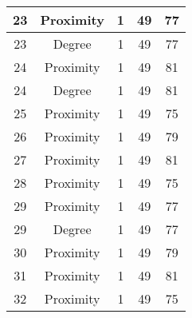 \documentclass[results.tex]{subfiles}
\begin{document}
\begin{center}
\begin{tabular}{| c || c | c | c | c |}
            \hline
            23                      & Proximity                    & 1                      & 49                      & 77                   \\
            \hline
            23                      & Degree                       & 1                      & 49                      & 77                   \\
            \hline
            24                      & Proximity                    & 1                      & 49                      & 81                   \\
            \hline
            24                      & Degree                       & 1                      & 49                      & 81                   \\
            \hline
            25                      & Proximity                    & 1                      & 49                      & 75                   \\
            \hline
            26                      & Proximity                    & 1                      & 49                      & 79                   \\
            \hline
            27                      & Proximity                    & 1                      & 49                      & 81                   \\
            \hline
            28                      & Proximity                    & 1                      & 49                      & 75                   \\
            \hline
            29                      & Proximity                    & 1                      & 49                      & 77                   \\
            \hline
            29                      & Degree                       & 1                      & 49                      & 77                   \\
            \hline
            30                      & Proximity                    & 1                      & 49                      & 79                   \\
            \hline
            31                      & Proximity                    & 1                      & 49                      & 81                   \\
            \hline
            32                      & Proximity                    & 1                      & 49                      & 75                   \\

\end{tabular}
\end{center}
\end{document}
